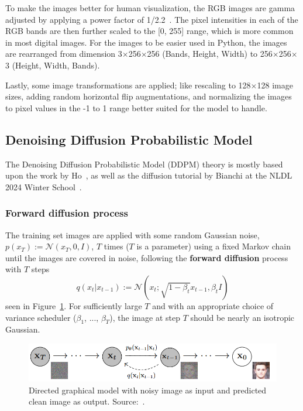 \documentclass[fullpaper]{nldl}
\begin{document}
To make the images better for human visualization, the RGB images are gamma adjusted by applying a power factor of 1/2.2~\cite{web:gamma}. The pixel intensities in each of the RGB bands are then further scaled to the [0, 255] range, which is more common in most digital images. For the images to be easier used in Python, the images are rearranged from dimension 3$\times$256$\times$256 (Bands, Height, Width) to 256$\times$256$\times$3 (Height, Width, Bands).

Lastly, some image transformations are applied; like rescaling to 128$\times$128 image sizes, adding random horizontal flip augmentations, and normalizing the images to pixel values in the -1 to 1 range better suited for the model to handle.


\subsection{Denoising Diffusion Probabilistic Model}
\label{subsect:DDPM}
The Denoising Diffusion Probabilistic Model (DDPM) theory is mostly based upon the work by Ho~\cite{ho2020denoising}, as well as the diffusion tutorial by Bianchi at the NLDL 2024 Winter School~\cite{bianchi2024DDPMtutorial}.


\subsubsection{Forward diffusion process}
\label{subsubsect:ForwardDiffusion}
The training set images are applied with some random Gaussian noise, $p(x_T):=\mathcal{N}(x_T,0,I)$, $T$ times ($T$ is a parameter) using a fixed Markov chain until the images are covered in noise, following the \textbf{forward diffusion} process with $T$ steps
\begin{equation}
	\label{eq:Forward}
	q(x_t|x_{t-1}) := \mathcal{N}(x_{t}; \sqrt{1-\beta_t}x_{t-1}, \beta_tI)
\end{equation}
seen in Figure~\ref{fig:DiffModelGraph}. For sufficiently large $T$ and with an appropriate choice of variance scheduler ($\beta_1$, ..., $\beta_T$), the image at step $T$ should be nearly an isotropic Gaussian.

\begin{figure}[h!]
	\centering
	\includegraphics[width=1\linewidth]{DiffModelGraph.png}
	\caption{Directed graphical model with noisy image as input and predicted clean image as output. Source:~\cite{ho2020denoising}. \label{fig:DiffModelGraph}}
\end{figure}
\end{document}
